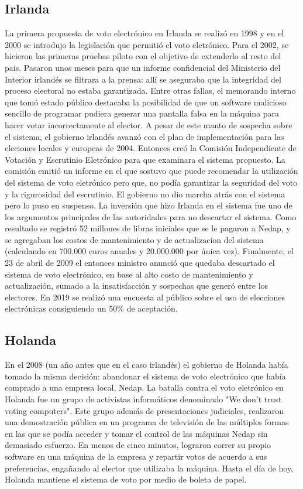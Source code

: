 \subsection{Irlanda}
La primera propuesta de voto electrónico en Irlanda se realizó en 1998 y en el 2000 se introdujo la legislación que permitió el voto eletrónico. Para el 2002, se hicieron las primeras pruebas piloto con el objetivo de extenderlo al resto del pais. Pasaron unos meses para que un informe confidencial del Ministerio del Interior irlandés se filtrara a la prensa: allí se aseguraba que la integridad del proceso electoral no estaba garantizada. Entre otras fallas, el memorando interno que tomó estado público destacaba la posibilidad de que un software malicioso sencillo de programar pudiera generar una pantalla falsa en la máquina para hacer votar incorrectamente al elector. A pesar de este manto de sospecha sobre el sistema, el gobierno irlandés avanzó con el plan de implementación para las eleciones locales y europeas de 2004. Entonces creó la Comisión Independiente de Votación y Escrutinio Eletrónico para que examinara el sistema propuesto. La comisión emitió un informe en el que sostuvo que puede recomendar la utilización del sistema de voto eletrónico pero que, no podía garantizar la seguridad del voto y la rigurosidad del escrutinio. El gobierno no dio marcha atrás con el sistema pero lo puso en suspenso. La inversión que hizo Irlanda en el sistema fue uno de los argumentos principales de las autoridades para no descartar el sistema. Como resultado se registró 52 millones de libras iniciales que se le pagaron a Nedap, y se agregaban los costos de mantenimiento y de actualizacion del sistema (calculando en 700.000 euros anuales y 20.000.000 por única vez).\newline
Finalmente, el 23 de abril de 2009 el entonces ministro anunció que quedaba descartado el sistema de voto electrónico, en base al alto costo de mantenimiento y actualización, sumado a la insatisfacción y sospechas que generó entre los electores. En 2019 se realizó una encuesta al público sobre el uso de elecciones electrónicas consiguiendo un 50\% de aceptación. \cite{eleccionesIrlanda}
\subsection{Holanda}
En el 2008 (un año antes que en el caso irlandés) el gobierno de Holanda había tomado la misma decisión: abandonar el sistema de voto electrónico que había comprado a una empresa local, Nedap. La batalla contra el voto eletrónico en Holanda fue un grupo de activistas informáticos denominado "We don't trust voting computers". Este grupo además de presentaciones judiciales, realizaron una demostración pública en un programa de televisión de las múltiples formas en las que se podía acceder y tomar el control de las máquinas Nedap sin demasiado esfuerzo. En menos de cinco minutos, lograron correr su propio software en una máquina de la empresa y repartir votos de acuerdo a sus preferencias, engañando al elector que utilizaba la máquina. Hasta el día de hoy, Holanda mantiene el sistema de voto por medio de boleta de papel.\cite{netherlands}

